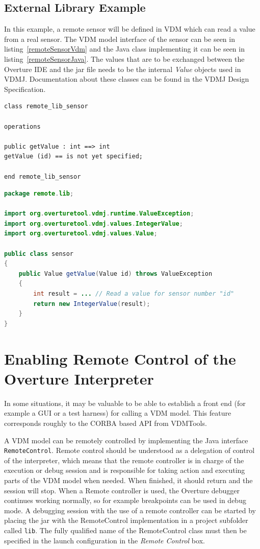 \documentclass{overturerepchap}
\begin{document}
\section{External Library Example}

In this example, a remote sensor will be defined in VDM which can read a
value from a real sensor. The VDM model interface of the sensor can be
seen in listing~\ref{remoteSensorVdm} and the Java class
implementing it can be seen in listing~\ref{remoteSensorJava}. The
values that are to be exchanged between the Overture IDE and the jar
file needs to be the internal \emph{Value} objects used in VDMJ. Documentation about
these classes can be found in the VDMJ Design Specification\cite{Battle10}.

\begin{lstlisting}[language=VDM++,label=remoteSensorVdm,caption=Remote sensor VDM class,captionpos=b]
class remote_lib_sensor

operations

public getValue : int ==> int
getValue (id) == is not yet specified;

end remote_lib_sensor
\end{lstlisting}


\begin{lstlisting}[language=JAVA,label=remoteSensorJava,caption=Remote sensor Java class,captionpos=b]
package remote.lib;

import org.overturetool.vdmj.runtime.ValueException;
import org.overturetool.vdmj.values.IntegerValue;
import org.overturetool.vdmj.values.Value;

public class sensor
{
	public Value getValue(Value id) throws ValueException
	{
		int result = ... // Read a value for sensor number "id"
		return new IntegerValue(result);
	}
}
\end{lstlisting}

\chapter{Enabling Remote Control of the Overture
  Interpreter}\label{sec:remote}

In some situations, it may be valuable to be able to establish a
front end (for example a GUI or a test harness) for calling a VDM model.
This feature corresponds roughly to the CORBA based API from
VDMTools\cite{APIMan}.

A VDM model can be remotely controlled by implementing the Java interface
\texttt{RemoteControl}. Remote control should be understood as a
delegation of control of the interpreter, which means that the remote
controller is in charge of the execution or debug session and is responsible for taking
action and executing parts of the VDM model when needed. When finished, it should
return and the session will stop. When a Remote controller is
used, the Overture debugger continues working normally, so for example
breakpoints can be used in debug mode. A debugging session with the use of a remote
controller can be started by placing the jar with the RemoteControl implementation
in a project subfolder called \texttt{lib}. The fully
qualified name of the RemoteControl class must then be specified in the
launch configuration in the \textit{Remote Control} box.
\end{document}
